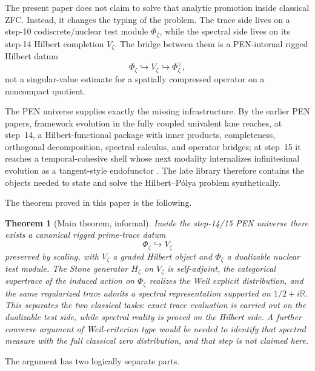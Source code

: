\documentclass[11pt,a4paper]{article}
\theoremstyle{plain}
\newtheorem{theorem}{Theorem}[section]
\theoremstyle{definition}
\newcommand{\R}{\mathbb{R}}
\begin{document}
The present paper does not claim to solve that analytic promotion inside classical ZFC. Instead, it changes the typing of the problem. The trace side lives on a step-10 codiscrete/nuclear test module $\Phi_{\zeta}$, while the spectral side lives on its step-14 Hilbert completion $V_{\zeta}$. The bridge between them is a PEN-internal rigged Hilbert datum
\[
  \Phi_{\zeta}\hookrightarrow V_{\zeta}\hookrightarrow \Phi_{\zeta}^{\vee},
\]
not a singular-value estimate for a spatially compressed operator on a noncompact quotient.

The PEN universe supplies exactly the missing infrastructure. By the earlier PEN papers, framework evolution in the fully coupled univalent lane reaches, at step~14, a Hilbert-functional package with inner products, completeness, orthogonal decomposition, spectral calculus, and operator bridges; at step~15 it reaches a temporal-cohesive shell whose next modality internalizes infinitesimal evolution as a tangent-style endofunctor \citep{lande-coherence,lande-generative,lande-automation,lande-framework}. The late library therefore contains the objects needed to state and solve the Hilbert--P\'olya problem synthetically.

The theorem proved in this paper is the following.

\begin{theorem}[Main theorem, informal]
Inside the step-14/15 PEN universe there exists a canonical rigged prime-trace datum
\[
  \Phi_{\zeta}\hookrightarrow V_{\zeta}
\]
preserved by scaling, with $V_{\zeta}$ a graded Hilbert object and $\Phi_{\zeta}$ a dualizable nuclear test module. The Stone generator $H_{\zeta}$ on $V_{\zeta}$ is self-adjoint, the categorical supertrace of the induced action on $\Phi_{\zeta}$ realizes the Weil explicit distribution, and the same regularized trace admits a spectral representation supported on $1/2+i\R$. This separates the two classical tasks: exact trace evaluation is carried out on the dualizable test side, while spectral reality is proved on the Hilbert side. A further converse argument of Weil-criterion type would be needed to identify that spectral measure with the full classical zero distribution, and that step is not claimed here.
\end{theorem}

The argument has two logically separate parts.
\end{document}
